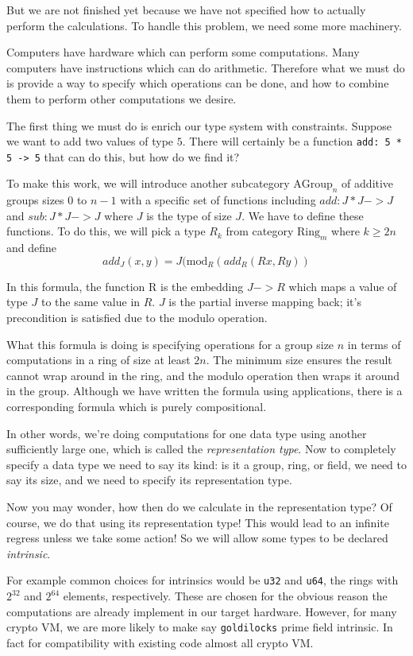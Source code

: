 \documentclass[oneside]{book}
\theoremstyle{plain}
\theoremstyle{definition}
\theoremstyle{plain}
\begin{document}
But we are not finished yet because we have not specified how to actually
perform the calculations. To handle this problem, we need some more
machinery.

Computers have hardware which can perform some computations. Many computers
have instructions which can do arithmetic. Therefore what we must do is
provide a way to specify which operations can be done, and how to
combine them to perform other computations we desire.

The first thing we must do is enrich our type system with constraints.
Suppose we want to add two values of type $5$. There will certainly
be a function \verb$add: 5 * 5 -> 5$ that can do this, but how do we find it?

To make this work, we will introduce another subcategory $\mathrm{AGroup}_n$ of
additive groups sizes 0 to $n-1$ with a specific set of functions including 
$add: J * J -> J$ and $sub: J * J -> J$ where $J$ is the type of size $J$.
We have to define these functions. To do this, we will pick a type $R_k$ from category
$\mathrm{Ring}_m$ where $k\ge 2n$ and define 
$$add_J (x,y) = J(\mathrm{mod}_R (add_R(R x, R y))$$ 

In this formula, the function R is the embedding $J->R$ which maps a value of type $J$ to
the same value in $R$. $J$ is the partial inverse mapping back; it's precondition is satisfied
due to the modulo operation. 

What this formula is doing is specifying operations for a group size $n$ in terms of computations
in a ring of size at least $2n$. The minimum size ensures the result cannot wrap around
in the ring, and the modulo operation then wraps it around in the group. Although we have
written the formula using applications, there is a corresponding formula which is purely
compositional.

In other words, we're doing computations for one data type using another sufficiently
large one, which is called the {\em representation type}. Now to completely specify
a data type we need to say its kind: is it a group, ring, or field, we need to say its
size, and we need to specify its representation type.

Now you may wonder, how then do we calculate in the representation type? Of course,
we do that using its representation type! This would lead to an infinite regress
unless we take some action! So we will allow some types to be declared {\em intrinsic}.

For example common choices for intrinsics would be \verb$u32$ and \verb$u64$,
the rings with $2^{32}$ and $2^{64}$ elements, respectively. These are chosen
for the obvious reason the computations are already implement in our target
hardware. However, for many crypto VM, we are more likely to make
say \verb$goldilocks$ prime field intrinsic. In fact for compatibility with
existing code almost all crypto VM.
\end{document}

